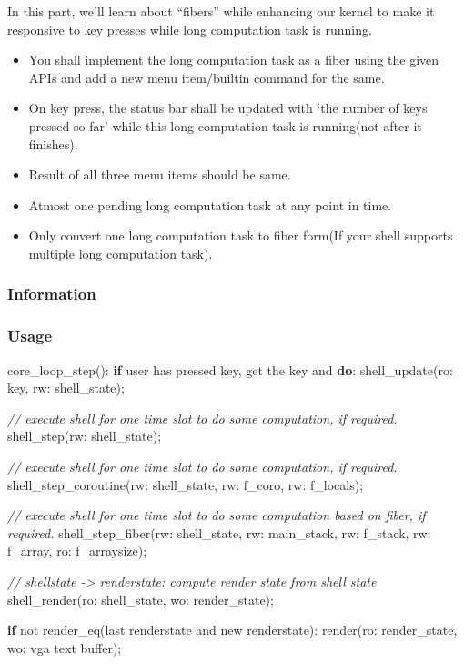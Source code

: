 \documentclass[]{book}
\newenvironment{Shaded}{}{}
\newcommand{\KeywordTok}[1]{\textbf{{#1}}}
\newcommand{\CommentTok}[1]{\textcolor[rgb]{0.50,0.50,0.50}{\textit{{#1}}}}
\newcommand{\NormalTok}[1]{{#1}}
\begin{document}
In this part, we'll learn about ``fibers'' while enhancing our kernel to
make it responsive to key presses while long computation task is
running.

\begin{itemize}
\itemsep1pt\parskip0pt
\item
  You shall implement the long computation task as a fiber using the
  given APIs and add a new menu item/builtin command for the same.
\item
  On key press, the status bar shall be updated with `the number of keys
  pressed so far' while this long computation task is running(not after
  it finishes).
\item
  Result of all three menu items should be same.
\item
  Atmost one pending long computation task at any point in time.
\item
  Only convert one long computation task to fiber form(If your shell
  supports multiple long computation task).
\end{itemize}

\subsubsection*{Information}\label{information-5}

\subsubsection*{Usage}\label{usage-5}

\begin{Shaded}
\begin{Highlighting}[]
        \NormalTok{core_loop_step():}
            \KeywordTok{if} \NormalTok{user has pressed key, get the key and }\KeywordTok{do}\NormalTok{:}
                \NormalTok{shell_update(ro: key, rw: shell_state);}

            \CommentTok{// execute shell for one time slot to do some computation, if required.}
            \NormalTok{shell_step(rw: shell_state);}

            \CommentTok{// execute shell for one time slot to do some computation, if required.}
            \NormalTok{shell_step_coroutine(rw: shell_state, rw: f_coro, rw: f_locals);}

            \CommentTok{// execute shell for one time slot to do some computation based on fiber, if required.}
            \NormalTok{shell_step_fiber(rw: shell_state, rw: main_stack, rw: f_stack, rw: f_array, ro: f_arraysize);}

            \CommentTok{// shellstate -> renderstate: compute render state from shell state}
            \NormalTok{shell_render(ro: shell_state, wo: render_state);}

            \KeywordTok{if} \NormalTok{not render_eq(last renderstate and new renderstate):}
                \NormalTok{render(ro: render_state, wo: vga text buffer);}
\end{Highlighting}
\end{Shaded}
\end{document}
